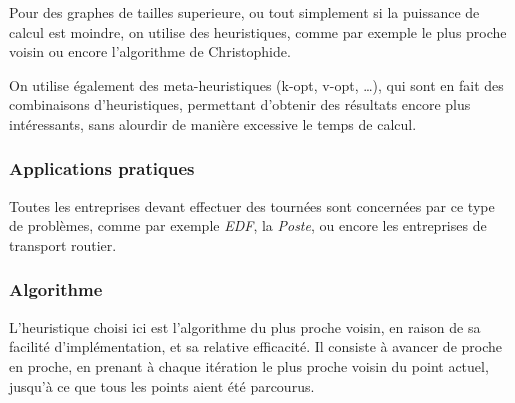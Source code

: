                 Pour des graphes de tailles superieure, ou tout simplement
                si la puissance de calcul est moindre, on utilise des heuristiques,
                comme par exemple le plus proche voisin ou encore l'algorithme de Christophide.

                On utilise également des meta-heuristiques (k-opt, v-opt, \ldots),
                qui sont en fait des combinaisons
                d'heuristiques, permettant d'obtenir des résultats encore plus intéressants,
                sans alourdir de manière excessive le temps de calcul.

        \subsubsection{Applications pratiques}
            Toutes les entreprises devant effectuer des tournées sont concernées
            par ce type de problèmes, comme par exemple \emph{EDF},
            la \emph{Poste}, ou encore les entreprises de transport routier.
        \subsubsection{Algorithme}
            L'heuristique choisi ici est l'algorithme du plus proche voisin,
            en raison de sa facilité d'implémentation, et sa relative efficacité.
            Il consiste à avancer de proche en proche, en prenant à chaque itération le plus
            proche voisin du point actuel, jusqu'à ce que tous les points aient
            été parcourus.
